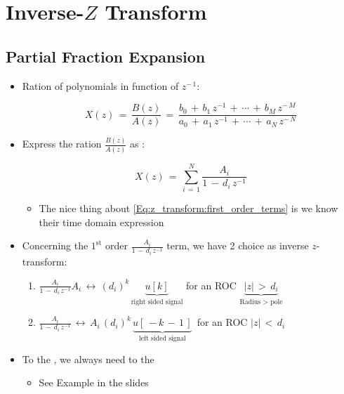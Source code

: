 \documentclass[12pt,a4paper]{book}
\begin{document}
\section{Inverse-$Z$ Transform}

\subsection{Partial Fraction Expansion}

\begin{itemize}

\item Ration of polynomials in function of $z^{- \, 1}$:

	\begin{equation}
	X(z) \, = \, \displaystyle\frac{B(z)}{A(z)}   \, = \, \displaystyle\frac{b_0 \, + \, b_1 \, z^{-1} \, + \, \cdots \, + \, b_M \, z^{- \, M}}{a_0 \, + \, a_1 \, z^{-1} \, + \, \cdots \, + \, a_N \, z^{- \, N}}
	\end{equation}
	
\item Express the ration $\displaystyle\frac{B(z)}{A(z)}$ as :

	\begin{equation}
	X(z) \, = \, \displaystyle\sum\limits_{i \, = \, 1}^N\frac{A_i}{1 \, - \, d_i \, z^{-1}}
	\label{Eq:z_transform:first_order_terms}
	\end{equation}
	
	\begin{itemize}
	\item The nice thing about  \autoref{Eq:z_transform:first_order_terms} is we know their time domain expression
	\end{itemize}	

\item Concerning the $1^{\mathrm{st}}$ order $\frac{A_i}{1 \, - \, d_i \, z^{-1}}$ term, we have 2 choice as inverse $z$-transform:

	\begin{enumerate}
	\item $ \displaystyle\frac{A_i}{1 \, - \, d_i \, z^{-1}} A_i \, \leftrightarrow \, (d_i)^k \, \underbrace{u[k] }_{\text{right sided signal}} $ for an ROC $\underbrace{|z| \, > \, d_i}_{\text{Radius $>$ pole}}$
	
	\item  $ \displaystyle\frac{A_i}{1 \, - \, d_i \, z^{-1}} \, \leftrightarrow \, A_i \, (d_i)^k \, \underbrace{ u[\, -k \, - \, 1 \,] }_{\text{left sided signal}}\, $ for an ROC $|z| \, < \, d_i$
	\end{enumerate}


\item To  the , we always need to  the 

	\begin{itemize}
	\item See Example in the slides
	\end{itemize}
	
\end{itemize}
\end{document}
